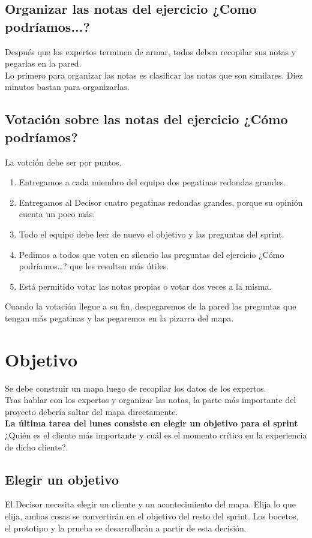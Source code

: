 \documentclass[10pt]{article}
\begin{document}
\begin{multicols}{2}
\subsection*{Organizar las notas del ejercicio ¿Como podríamos...?}
Después que los expertos terminen de armar, todos deben recopilar sus notas y pegarlas en la pared.\\
Lo primero para organizar las notas es clasificar las notas que son similares. Diez minutos bastan para organizarlas.
\subsection*{Votación sobre las notas del ejercicio ¿Cómo podríamos?}
La votción debe ser por puntos.
\begin{enumerate}[\bfseries 1.]
\item Entregamos a cada miembro del equipo dos pegatinas redondas
grandes.
\item Entregamos al Decisor cuatro pegatinas redondas grandes, porque su opinión cuenta un poco más.
\item Todo el equipo debe leer de nuevo el objetivo y las preguntas del sprint.
\item Pedimos a todos que voten en silencio las preguntas del ejercicio ¿Cómo podríamos…? que les resulten más útiles.
\item Está permitido votar las notas propias o votar dos veces a la misma.\\
\end{enumerate}
Cuando la votación llegue a su fin, despegaremos de la pared las preguntas que tengan más pegatinas y las pegaremos en la pizarra del mapa.
\section*{Objetivo}
Se debe construir un mapa luego de recopilar los datos de los expertos.\\
Tras hablar con los expertos y organizar las notas, la parte más
importante del proyecto debería saltar del mapa directamente.\\
\textbf{La última tarea del lunes consiste en elegir un objetivo para el sprint}\\
¿Quién es el cliente más importante y cuál es el momento crítico en la experiencia de dicho cliente?. 
\subsection*{Elegir un objetivo}
El Decisor necesita elegir un cliente y un acontecimiento del mapa. Elija lo que elija, ambas cosas se convertirán en el objetivo del resto del sprint. Los bocetos, el prototipo y la prueba se desarrollarán a partir de esta decisión.

\end{multicols}
\end{document}
